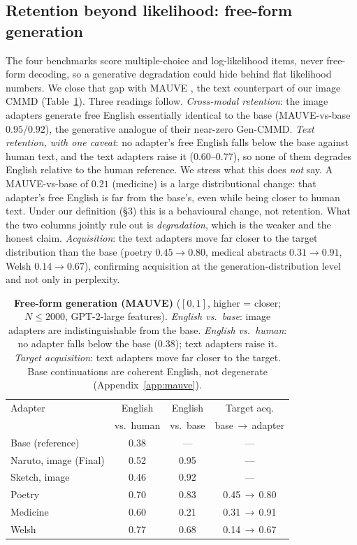 \documentclass{article}
\begin{document}
\subsection{Retention beyond likelihood: free-form generation}
The four benchmarks score multiple-choice and log-likelihood items, never
free-form decoding, so a generative degradation could hide behind flat
likelihood numbers. We close that gap with MAUVE \citep{pillutla2021mauve}, the
text counterpart of our image CMMD (Table~\ref{tab:mauve}). Three readings
follow. \emph{Cross-modal retention}: the image adapters generate free English
essentially identical to the base (MAUVE-vs-base $0.95$/$0.92$), the generative
analogue of their near-zero Gen-CMMD. \emph{Text retention, with one caveat}: no
adapter's free English falls below the base against human text, and the text
adapters raise it ($0.60$--$0.77$), so none of them degrades English relative to
the human reference. We stress what this does \emph{not} say. A MAUVE-vs-base of
$0.21$ (medicine) is a large distributional change: that adapter's free English is
far from the base's, even while being closer to human text. Under our definition
(\S3) this is a behavioural change, not retention. What the two columns jointly
rule out is \emph{degradation}, which is the weaker and the honest claim.
\emph{Acquisition}: the
text adapters move far closer to the target distribution than the base (poetry
$0.45\to0.80$, medical abstracts $0.31\to0.91$, Welsh $0.14\to0.67$), confirming
acquisition at the generation-distribution level and not only in perplexity.

\begin{table}[t]
\caption{\textbf{Free-form generation (MAUVE)} \citep{pillutla2021mauve}
($[0,1]$, higher = closer; $N\!\le\!2000$, GPT-2-large features). \emph{English
vs.\ base}: image adapters are indistinguishable from the base. \emph{English
vs.\ human}: no adapter falls below the base ($0.38$); text adapters raise it.
\emph{Target acquisition}: text adapters move far closer to the target. Base
continuations are coherent English, not degenerate (Appendix~\ref{app:mauve}).}
\label{tab:mauve}
\centering\small
\begin{tabular}{lccc}
\toprule
Adapter & English & English & Target acq. \\
        & vs.\ human & vs.\ base & base\,$\to$\,adapter \\
\midrule
Base (reference)        & 0.38 & --- & --- \\
Naruto, image (Final)   & 0.52 & 0.95 & --- \\
Sketch, image           & 0.46 & 0.92 & --- \\
Poetry                  & 0.70 & 0.83 & 0.45\,$\to$\,0.80 \\
Medicine                & 0.60 & 0.21 & 0.31\,$\to$\,0.91 \\
Welsh                   & 0.77 & 0.68 & 0.14\,$\to$\,0.67 \\
\bottomrule
\end{tabular}
\end{table}
\end{document}
